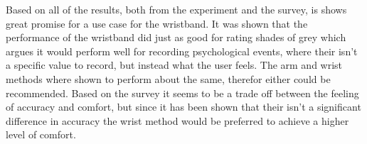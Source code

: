 Based on all of the results, both from the experiment and the survey, is shows great promise for a use case for the wristband. It was shown that the performance of the wristband did just as good for rating shades of grey which argues it would perform well for recording  psychological events, where their isn't a specific value to record, but instead what the user feels. The arm and wrist methods where shown to perform about the same, therefor either could be recommended. Based on the survey it seems to be a trade off between the feeling of accuracy and comfort, but since it has been shown that their isn't a significant difference in accuracy the wrist method would be preferred to achieve a higher level of comfort.
